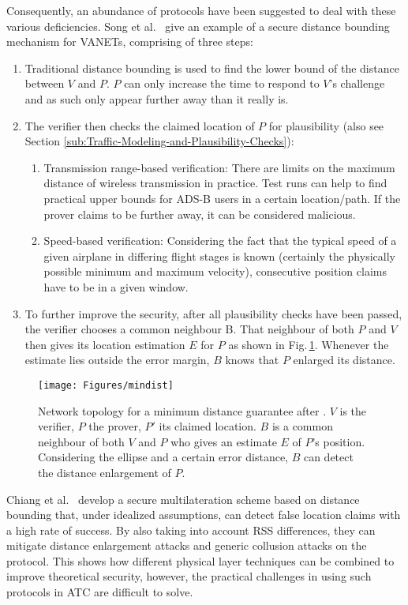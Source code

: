 \documentclass[english]{IEEEtran}
\begin{document}
Consequently, an abundance of protocols have been suggested to deal
with these various deficiencies. Song et al.~\cite{Song2008} give
an example of a secure distance bounding mechanism for VANETs, comprising
of three steps:
\begin{enumerate}
\item Traditional distance bounding is used to find the lower bound of the
distance between $V$ and $P$. $P$ can only increase the time to
respond to $V$'s challenge and as such only appear further away than
it really is.
\item The verifier then checks the claimed location of $P$ for plausibility
(also see Section \ref{sub:Traffic-Modeling-and-Plausibility-Checks}):

\begin{enumerate}
\item Transmission range-based verification: There are limits on the maximum
distance of wireless transmission in practice. Test runs can help
to find practical upper bounds for ADS-B users in a certain location/path.
If the prover claims to be further away, it can be considered malicious.
\item Speed-based verification: Considering the fact that the typical speed
of a given airplane in differing flight stages is known (certainly
the physically possible minimum and maximum velocity), consecutive
position claims have to be in a given window.
\end{enumerate}
\item To further improve the security, after all plausibility checks have
been passed, the verifier chooses a common neighbour B. That neighbour
of both $P$ and $V$ then gives its location estimation $E$ for
$P$ as shown in Fig.\,\ref{fig:Minimum-distance-guarantee.}. Whenever
the estimate lies outside the error margin, $B$ knows that $P$ enlarged
its distance.\emph{ }
\end{enumerate}
\begin{figure}
\texttt{[image: Figures/mindist]}

\caption{Network topology for a minimum distance guarantee after \cite{Song2008}.
$V$ is the verifier, $P$ the prover, $P'$ its claimed location.
$B$ is a common neighbour of both $V$ and $P$ who gives an estimate
$E$ of $P$'s position. Considering the ellipse and a certain error
distance, $B$ can detect the distance enlargement of $P$. \label{fig:Minimum-distance-guarantee.}}


\end{figure}
Chiang et al.~\cite{Chiang2009,Chiang2012} develop a secure multilateration
scheme based on distance bounding that, under idealized assumptions,
can detect false location claims with a high rate of success. By also
taking into account RSS differences, they can mitigate distance enlargement
attacks and generic collusion attacks on the protocol. This shows
how different physical layer techniques can be combined to improve
theoretical security, however, the practical challenges in using such
protocols in ATC are difficult to solve.
\end{document}
